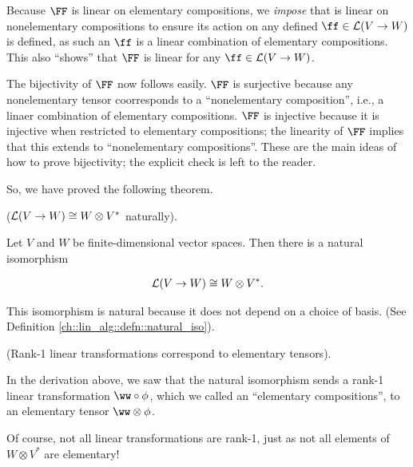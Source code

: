 Because $\FF$ is linear on elementary compositions, we \textit{impose} that is linear on nonelementary compositions to ensure its action on any defined $\ff \in \LLLL(V \rightarrow W)$ is defined, as such an $\ff$ is a linear combination of elementary compositions. This also ``shows'' that $\FF$ is linear for any $\ff \in \LLLL(V \rightarrow W)$.

The bijectivity of $\FF$ now follows easily. $\FF$ is surjective because any nonelementary tensor coorresponds to a ``nonelementary composition'', i.e., a linaer combination of elementary compositions. $\FF$ is injective because it is injective when restricted to elementary compositions; the linearity of $\FF$ implies that this extends to ``nonelementary compositions''. These are the main ideas of how to prove bijectivity; the explicit check is left to the reader.

So, we have proved the following theorem.

\begin{theorem}
\label{ch::motivated_intro::thm::lin_V_W_iso_W_otimes_V}
    ($\mathcal{L}(V \rightarrow W) \cong W \otimes V^*$ naturally). 
    
    Let $V$ and $W$ be finite-dimensional vector spaces. Then there is a natural isomorphism
    
    \begin{align*}
        \mathcal{L}(V \rightarrow W) \cong W \otimes V^*.
    \end{align*}
    
    This isomorphism is natural because it does not depend on a choice of basis. (See Definition \ref{ch::lin_alg::defn::natural_iso}).
\end{theorem}

\begin{remark}
    (Rank-1 linear transformations correspond to elementary tensors).
    
    In the derivation above, we saw that the natural isomorphism sends a rank-1 linear transformation $\ww \circ \phi$, which we called an ``elementary compositions'', to an elementary tensor $\ww \otimes \phi$.
    
    Of course, not all linear transformations are rank-1, just as not all elements of $W \otimes V^*$ are elementary!
\end{remark}

